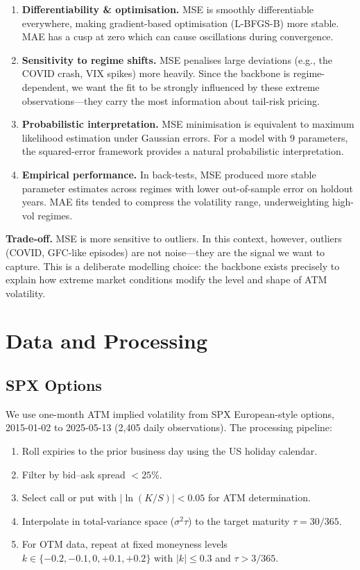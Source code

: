 \documentclass[12pt]{article}
\begin{document}
\begin{enumerate}
  \item \textbf{Differentiability \& optimisation.} MSE is smoothly differentiable everywhere, making gradient-based optimisation (L-BFGS-B) more stable. MAE has a cusp at zero which can cause oscillations during convergence.
  \item \textbf{Sensitivity to regime shifts.} MSE penalises large deviations (e.g., the COVID crash, VIX spikes) more heavily. Since the backbone is regime-dependent, we want the fit to be strongly influenced by these extreme observations---they carry the most information about tail-risk pricing.
  \item \textbf{Probabilistic interpretation.} MSE minimisation is equivalent to maximum likelihood estimation under Gaussian errors. For a model with 9 parameters, the squared-error framework provides a natural probabilistic interpretation.
  \item \textbf{Empirical performance.} In back-tests, MSE produced more stable parameter estimates across regimes with lower out-of-sample error on holdout years. MAE fits tended to compress the volatility range, underweighting high-vol regimes.
\end{enumerate}

\noindent\textbf{Trade-off.} MSE is more sensitive to outliers. In this context, however, outliers (COVID, GFC-like episodes) are not noise---they are the signal we want to capture. This is a deliberate modelling choice: the backbone exists precisely to explain how extreme market conditions modify the level and shape of ATM volatility.


\section{Data and Processing}
\label{sec:data}

\subsection{SPX Options}

We use one-month ATM implied volatility from SPX European-style options, 2015-01-02 to 2025-05-13 (2,405 daily observations). The processing pipeline:
\begin{enumerate}
  \item Roll expiries to the prior business day using the US holiday calendar.
  \item Filter by bid--ask spread $< 25\%$.
  \item Select call or put with $|\ln(K/S)| < 0.05$ for ATM determination.
  \item Interpolate in total-variance space ($\sigma^2 \tau$) to the target maturity $\tau = 30/365$.
  \item For OTM data, repeat at fixed moneyness levels $k \in \{-0.2, -0.1, 0, +0.1, +0.2\}$ with $|k| \le 0.3$ and $\tau > 3/365$.
\end{enumerate}
\end{document}
